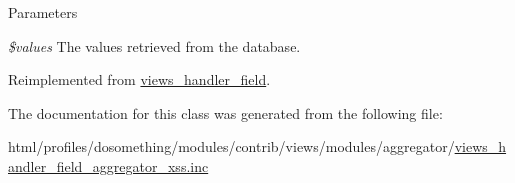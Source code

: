 \begin{DoxyParams}{Parameters}
\item[{\em \$values}]The values retrieved from the database. \end{DoxyParams}


Reimplemented from \hyperlink{classviews__handler__field_a82ff951c5e9ceb97b2eab86f880cbc1e}{views\_\-handler\_\-field}.

The documentation for this class was generated from the following file:\begin{DoxyCompactItemize}
\item 
html/profiles/dosomething/modules/contrib/views/modules/aggregator/\hyperlink{views__handler__field__aggregator__xss_8inc}{views\_\-handler\_\-field\_\-aggregator\_\-xss.inc}\end{DoxyCompactItemize}
